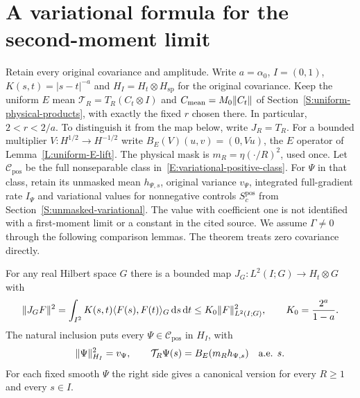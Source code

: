 \section{A variational formula for the second-moment limit}
\label{S:intrinsic-second-moment}

Retain every original covariance and amplitude. Write $a = \alpha_0$, $I =
(0,1)$, $K(s,t) = |s-t|^{-a}$ and $H_I = H_t\otimes H_{\mathrm{sp}}$ for the
original covariance. Keep the uniform $E$ mean $\mathcal{T}_R = T_R(C_t\otimes
I)$ and $C_{\rm mean} = M_0\|C_t\|$ of
Section~\ref{S:uniform-physical-products}, with exactly the fixed $r$ chosen
there. In particular, $2 < r < 2/a$. To distinguish it from the map below, write
$J_R = T_R$. For a bounded multiplier $V:H^{1/2} \to H^{-1/2}$ write
$B_E(V)(u,v) = (0,Vu)$, the $E$ operator of Lemma~\ref{L:uniform-E-lift}. The
physical mask is $m_R = \eta(\cdot/R)^2$, used once. Let
$\mathcal{C}_{\mathrm{pos}}$ be the full nonseparable class
in~\eqref{E:variational-positive-class}. For $\Psi$ in that class, retain its
unmasked mean $h_{\Psi,s}$, original variance $v_\Psi$, integrated full-gradient
rate $I_\Psi$ and variational values for nonnegative controls
$S_c^{\mathrm{pos}}$ from Section~\ref{S:unmasked-variational}. The value with
coefficient one is not identified with a first-moment limit or a constant in the
cited source. We assume $\Gamma \ne 0$ through the following comparison lemmas.
The theorem treats zero covariance directly.

\begin{lemma}
  \label{L:positive-raw-embedding}
  For any real Hilbert space $G$ there is a bounded map $J_G:L^2(I;G) \to
  H_t\otimes G$ with
  \begin{equation}\label{E:positive-bochner-inclusion}
    \|J_GF\|^2
    =\int_{I^2}K(s,t)\langle F(s),F(t)\rangle_G\,\mathrm{d} s\,\mathrm{d} t
    \le K_0\|F\|_{L^2(I;G)}^2,\qquad K_0=\frac{2^a}{1-a}.
  \end{equation}
  The natural inclusion puts every $\Psi \in \mathcal{C}_{\mathrm{pos}}$ in
  $H_I$, with
  \begin{equation}\label{E:positive-raw-mean}
    \|\Psi\|_{H_I}^2=v_\Psi,\qquad
    \mathcal{T}_R\Psi(s)=B_E(m_Rh_{\Psi,s})\quad\hbox{a.e. }s.
  \end{equation}
  For each fixed smooth $\Psi$ the right side gives a canonical version for
  every $R \ge 1$ and every $s \in I$.
\end{lemma}

